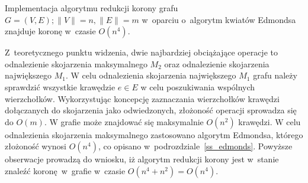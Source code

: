 \begin{theorem}
  Implementacja algorytmu redukcji korony grafu $G=(V,E); \|V\|=n,\|E\|=m$ 
  w~oparciu o~algorytm kwiatów Edmondsa znajduje koronę w~czasie $O(n^{4})$.
\end{theorem}
\begin{bproof}
  Z~teoretycznego punktu widzenia, dwie najbardziej obciążające operacje to
  odnalezienie skojarzenia maksymalnego $M_2$ oraz odnalezienie skojarzenia
  największego $M_1$.
  W celu odnalezienia skojarzenia największego $M_1$ grafu należy
  sprawdzić wszystkie krawędzie $e\in E$ w celu poszukiwania wspólnych
  wierzchołków.
  Wykorzystując koncepcję zaznaczania wierzchołków krawędzi dołączanych do 
  skojarzenia jako odwiedzonych, złożoność operacji sprowadza się do $O(m)$.
  W grafie może znajdować się maksymalnie $O(n^{2})$ krawędzi.
  W celu odnalezienia skojarzenia maksymalnego zastosowano algorytm Edmondsa,
  którego złożoność wynosi $O(n^{4})$, co opisano 
  w~podrozdziale~\ref{ss_edmonds}.
  Powyższe obserwacje prowadzą do wniosku, iż algorytm redukcji korony jest 
  w~stanie znaleźć koronę w~grafie w~czasie $O(n^{4} + n^{2})=O(n^{4})$.
\end{bproof}
